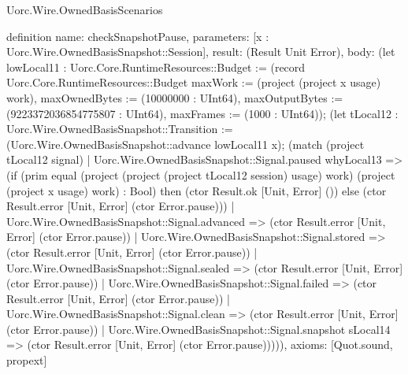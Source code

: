 \begin{lexlean}{Uorc.Wire.OwnedBasisScenarios}
\begin{semanticmodule}
definition{
  name: checkSnapshotPause,
  parameters: [x : Uorc.Wire.OwnedBasisSnapshot::Session],
  result: (Result Unit Error),
  body: (let lowLocal11 : Uorc.Core.RuntimeResources::Budget := (record Uorc.Core.RuntimeResources::Budget {maxWork := (project (project x usage) work), maxOwnedBytes := (10000000 : UInt64), maxOutputBytes := (9223372036854775807 : UInt64), maxFrames := (1000 : UInt64)}); (let tLocal12 : Uorc.Wire.OwnedBasisSnapshot::Transition := (Uorc.Wire.OwnedBasisSnapshot::advance lowLocal11 x); (match (project tLocal12 signal)
    | Uorc.Wire.OwnedBasisSnapshot::Signal.paused whyLocal13 => (if (prim equal (project (project (project tLocal12 session) usage) work) (project (project x usage) work) : Bool) then (ctor Result.ok [Unit, Error] ()) else (ctor Result.error [Unit, Error] (ctor Error.pause)))
    | Uorc.Wire.OwnedBasisSnapshot::Signal.advanced => (ctor Result.error [Unit, Error] (ctor Error.pause))
    | Uorc.Wire.OwnedBasisSnapshot::Signal.stored => (ctor Result.error [Unit, Error] (ctor Error.pause))
    | Uorc.Wire.OwnedBasisSnapshot::Signal.sealed => (ctor Result.error [Unit, Error] (ctor Error.pause))
    | Uorc.Wire.OwnedBasisSnapshot::Signal.failed => (ctor Result.error [Unit, Error] (ctor Error.pause))
    | Uorc.Wire.OwnedBasisSnapshot::Signal.clean => (ctor Result.error [Unit, Error] (ctor Error.pause))
    | Uorc.Wire.OwnedBasisSnapshot::Signal.snapshot sLocal14 => (ctor Result.error [Unit, Error] (ctor Error.pause))))),
  axioms: [Quot.sound, propext]
}


\end{semanticmodule}
\end{lexlean}
